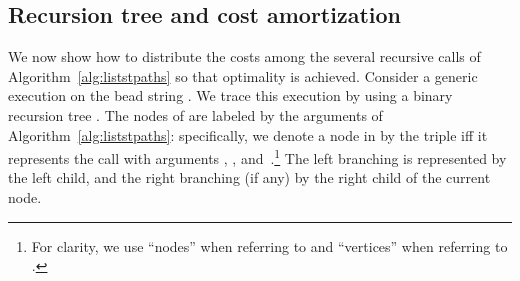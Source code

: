 \subsection{Recursion tree and cost amortization}
\label{sub:recursion-tree-cost}

We now show how to distribute the costs among the several recursive
calls of Algorithm~\ref{alg:liststpaths} so that optimality is
achieved. Consider a generic execution on the bead string
. We trace this execution by using a binary recursion
tree . The nodes of  are labeled by the arguments of 
Algorithm~\ref{alg:liststpaths}: specifically, we denote a node
in  by the triple  iff it
represents the call with arguments , , and~.\footnote{For
clarity, we use ``nodes'' when referring to  and ``vertices'' when
referring to .}  The left branching is represented by the
left child, and the right branching (if any) by the right child of the
current node. 

